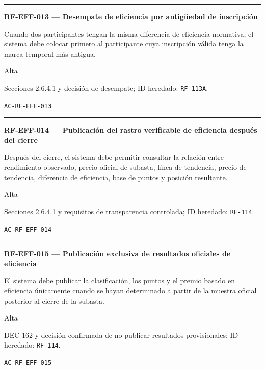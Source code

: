 \documentclass[10pt,letterpaper]{article}
\begin{document}
\vspace{0.25em}\hrule\vspace{0.65em}
\noindent\textbf{RF-EFF-013 --- Desempate de eficiencia por antigüedad de inscripción}\par
\begin{description}[style=nextline,leftmargin=3.15cm,labelwidth=2.8cm,font=\normalfont\bfseries]
\item[Obligación] Cuando dos participantes tengan la misma diferencia de eficiencia normativa, el sistema debe colocar primero al participante cuya inscripción válida tenga la marca temporal más antigua.
\item[Prioridad] Alta
\item[Procedencia] Secciones 2.6.4.1 y decisión de desempate; ID heredado: \texttt{RF-113A}.
\item[Verificación] \texttt{AC-RF-EFF-013}
\end{description}
\vspace{0.25em}\hrule\vspace{0.65em}
\noindent\textbf{RF-EFF-014 --- Publicación del rastro verificable de eficiencia después del cierre}\par
\begin{description}[style=nextline,leftmargin=3.15cm,labelwidth=2.8cm,font=\normalfont\bfseries]
\item[Obligación] Después del cierre, el sistema debe permitir consultar la relación entre rendimiento observado, precio oficial de subasta, línea de tendencia, precio de tendencia, diferencia de eficiencia, base de puntos y posición resultante.
\item[Prioridad] Alta
\item[Procedencia] Secciones 2.6.4.1 y requisitos de transparencia controlada; ID heredado: \texttt{RF-114}.
\item[Verificación] \texttt{AC-RF-EFF-014}
\end{description}
\vspace{0.25em}\hrule\vspace{0.65em}
\noindent\textbf{RF-EFF-015 --- Publicación exclusiva de resultados oficiales de eficiencia}\par
\begin{description}[style=nextline,leftmargin=3.15cm,labelwidth=2.8cm,font=\normalfont\bfseries]
\item[Obligación] El sistema debe publicar la clasificación, los puntos y el premio basado en eficiencia únicamente cuando se hayan determinado a partir de la muestra oficial posterior al cierre de la subasta.
\item[Prioridad] Alta
\item[Procedencia] DEC-162 y decisión confirmada de no publicar resultados provisionales; ID heredado: \texttt{RF-114}.
\item[Verificación] \texttt{AC-RF-EFF-015}
\end{description}
\end{document}
